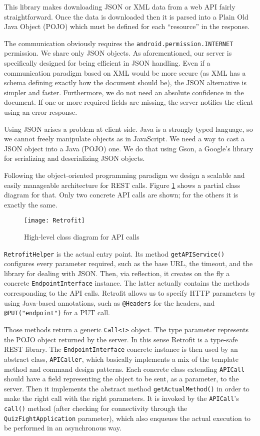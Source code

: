 This library makes downloading JSON or XML data from a web API fairly 
straightforward. Once the data is downloaded then it is parsed into a 
Plain Old Java Object (POJO) which must be defined for each ``resource'' 
in the response.

The communication obviously requires the \texttt{android.permission.INTERNET}
permission. We share only JSON objects. As aforementioned, our server is 
specifically designed for being efficient in JSON handling. Even if a 
communication paradigm based on XML would be more secure (as XML has a schema
defining exactly how the document should be), the JSON alternative is simpler 
and faster. Furthermore, we do not need an absolute confidence in the document. If
one or more required fields are missing, the server notifies the client using an
error response.

Using JSON arises a problem at client side. Java is a strongly typed language, so we
cannot freely manipulate objects as in JavaScript. We need a way to cast a JSON 
object into a Java (POJO) one. We do that using Gson, a Google's library for 
serializing and deserializing JSON objects. 

Following the object-oriented programming paradigm we design a scalable and easily 
manageable architecture for REST calls. Figure \ref{fig:retrofit} shows a partial
class diagram for that. Only two concrete API calls are shown; for the others it 
is exactly the same.
\begin{figure}[h]
	\centering
	\texttt{[image: Retrofit]}
	\caption{High-level class diagram for API calls}
	\label{fig:retrofit}
\end{figure}

\texttt{RetrofitHelper} is the actual entry point. Its method \texttt{getAPIService()}
configures every parameter required, such as the base URL, the timeout, and the 
library for dealing with JSON. Then, via reflection, it creates on the fly a 
concrete \texttt{EndpointInterface} instance. The latter actually contains the
methods corresponding to the API calls. Retrofit allows us to specify HTTP
parameters by using Java-based annotations, such as \texttt{@Headers} for the
headers, and \texttt{@PUT("endpoint")} for a PUT call. 

Those methods return a generic \texttt{Call<T>} object. The type parameter 
represents the POJO object returned by the server. In this sense Retrofit is a
type-safe REST library. The \texttt{EndpointInterface} concrete instance is then
used by an abstract class, \texttt{APICaller}, which basically implements a mix
of the template method and command design patterns. Each concrete class extending
\texttt{APICall} should have a field representing the object to be sent, 
as a parameter, to the server. Then it implements the abstract method 
\texttt{getActualMethod()} in order to make the right call with the right 
parameters. It is invoked by the \texttt{APICall}'s \texttt{call()} method
(after checking for connectivity through the \texttt{QuizFightApplication}
parameter), which also enqueues the actual execution to be performed in
an asynchronous way.

